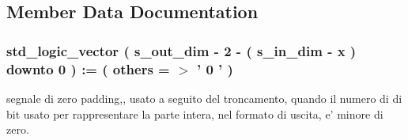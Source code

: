 \subsection{Member Data Documentation}
\hypertarget{classtruncate_1_1dataflow_a130836df2917c4b75d1fc24500082e76}{
\subsubsection[{padding\+\_\+neg}]{ {\bfseries \textcolor{vhdlchar}{std\+\_\+logic\+\_\+vector}\textcolor{vhdlchar}{ }\textcolor{vhdlchar}{(}\textcolor{vhdlchar}{ }\textcolor{vhdlchar}{ }\textcolor{vhdlchar}{ }\textcolor{vhdlchar}{ }{\bfseries {\bf s\+\_\+out\+\_\+dim}} \textcolor{vhdlchar}{-\/}\textcolor{vhdlchar}{ } \textcolor{vhdldigit}{2} \textcolor{vhdlchar}{-\/}\textcolor{vhdlchar}{ }\textcolor{vhdlchar}{(}\textcolor{vhdlchar}{ }\textcolor{vhdlchar}{ }\textcolor{vhdlchar}{ }\textcolor{vhdlchar}{ }{\bfseries {\bf s\+\_\+in\+\_\+dim}} \textcolor{vhdlchar}{-\/}\textcolor{vhdlchar}{ }\textcolor{vhdlchar}{ }\textcolor{vhdlchar}{ }{\bfseries {\bf x}} \textcolor{vhdlchar}{ }\textcolor{vhdlchar}{)}\textcolor{vhdlchar}{ }\textcolor{vhdlchar}{ }\textcolor{vhdlchar}{downto}\textcolor{vhdlchar}{ }\textcolor{vhdlchar}{ } \textcolor{vhdldigit}{0} \textcolor{vhdlchar}{ }\textcolor{vhdlchar}{)}\textcolor{vhdlchar}{ }\textcolor{vhdlchar}{ }\textcolor{vhdlchar}{ }\textcolor{vhdlchar}{\+:}\textcolor{vhdlchar}{=}\textcolor{vhdlchar}{ }\textcolor{vhdlchar}{(}\textcolor{vhdlchar}{ }\textcolor{vhdlchar}{ }\textcolor{vhdlchar}{others}\textcolor{vhdlchar}{ }\textcolor{vhdlchar}{ }\textcolor{vhdlchar}{=}\textcolor{vhdlchar}{ }\textcolor{vhdlchar}{$>$}\textcolor{vhdlchar}{ }\textcolor{vhdlchar}{'}\textcolor{vhdlchar}{ } \textcolor{vhdldigit}{0} \textcolor{vhdlchar}{ }\textcolor{vhdlchar}{'}\textcolor{vhdlchar}{ }\textcolor{vhdlchar}{)}\textcolor{vhdlchar}{ }} \hspace{0.3cm}{\ttfamily [Signal]}}}\label{classtruncate_1_1dataflow_a130836df2917c4b75d1fc24500082e76}


segnale di zero padding,, usato a seguito del troncamento, quando il numero di di bit usato per rappresentare la parte intera, nel formato di uscita, e' minore di zero. 

